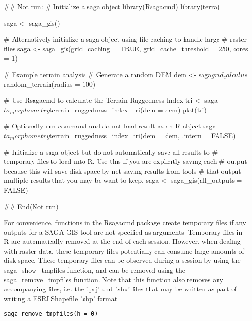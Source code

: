 \documentclass[a4paper]{book}
\begin{document}
\begin{Examples}
\begin{ExampleCode}
## Not run: 
# Initialize a saga object
library(Rsagacmd)
library(terra)

saga <- saga_gis()

# Alternatively initialize a saga object using file caching to handle large
# raster files
saga <- saga_gis(grid_caching = TRUE, grid_cache_threshold = 250, cores = 1)

# Example terrain analysis
# Generate a random DEM
dem <- saga$grid_calculus$random_terrain(radius = 100)

# Use Rsagacmd to calculate the Terrain Ruggedness Index
tri <- saga$ta_morphometry$terrain_ruggedness_index_tri(dem = dem)
plot(tri)

# Optionally run command and do not load result as an R object
saga$ta_morphometry$terrain_ruggedness_index_tri(dem = dem, .intern = FALSE)

# Initialize a saga object but do not automatically save all results to
# temporary files to load into R. Use this if you are explicitly saving each
# output because this will save disk space by not saving results from tools
# that output multiple results that you may be want to keep.
saga <- saga_gis(all_outputs = FALSE)

## End(Not run)
\end{ExampleCode}
\end{Examples}
%
\begin{Description}
For convenience, functions in the Rsagacmd package create temporary files if
any outputs for a SAGA-GIS tool are not specified as arguments. Temporary
files in R are automatically removed at the end of each session. However,
when dealing with raster data, these temporary files potentially can consume
large amounts of disk space. These temporary files can be observed during a
session by using the saga\_show\_tmpfiles function, and can be removed using
the saga\_remove\_tmpfiles function. Note that this function also removes any
accompanying files, i.e. the '.prj' and '.shx' files that may be written as
part of writing a ESRI Shapefile '.shp' format
\end{Description}
%
\begin{Usage}
\begin{verbatim}
saga_remove_tmpfiles(h = 0)
\end{verbatim}
\end{Usage}
\end{document}
